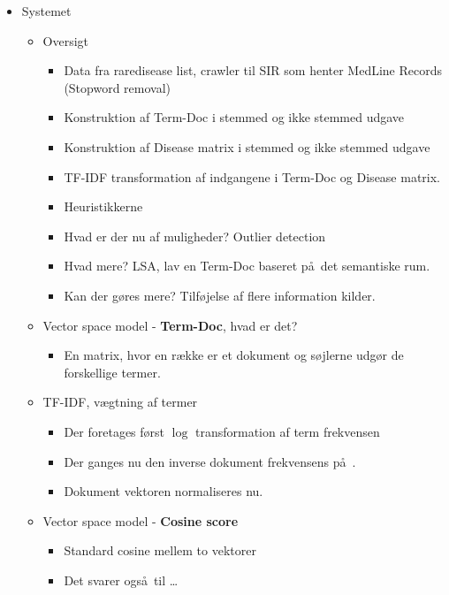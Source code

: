 \documentclass[a4paper, 10pt, english, final]{report}
\begin{document}

\begin{itemize}

  \item Systemet
    \begin{itemize}
      \item Oversigt
        \begin{itemize}
          \item Data fra raredisease list, crawler til SIR som henter MedLine Records (Stopword removal)
          \item Konstruktion af Term-Doc i stemmed og ikke stemmed udgave
          \item Konstruktion af Disease matrix i stemmed og ikke stemmed udgave
          \item TF-IDF transformation af indgangene i Term-Doc og Disease matrix.
          \item Heuristikkerne
          \item Hvad er der nu af muligheder? Outlier detection
          \item Hvad mere? LSA, lav en Term-Doc baseret p\aa\ det semantiske rum.
          \item Kan der g\o res mere? Tilf\o jelse af flere information kilder.
        \end{itemize}
      \item Vector space model - \textbf{Term-Doc}, hvad er det?
        \begin{itemize}
          \item En matrix, hvor en r\ae kke er et dokument og s\o jlerne udg\o r de forskellige termer.
        \end{itemize}
      \item TF-IDF, v\ae gtning af termer
        \begin{itemize}
          \item Der foretages f\o rst $\log$ transformation af term frekvensen
          \item Der ganges nu den inverse dokument frekvensens p\aa\ .
          \item Dokument vektoren normaliseres nu.
        \end{itemize}
      \item Vector space model - \textbf{Cosine score}
        \begin{itemize}
          \item Standard cosine mellem to vektorer
          \item Det svarer ogs\aa\ til \ldots

\end{itemize}
\end{itemize}
\end{itemize}
\end{document}
